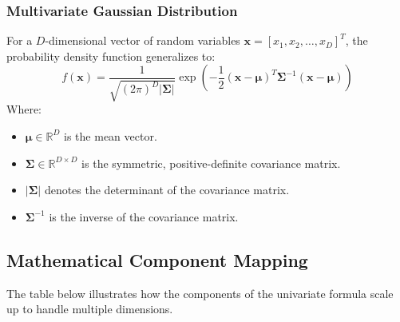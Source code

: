 \documentclass[a4paper,11pt]{article}
\begin{document}
\subsubsection{Multivariate Gaussian Distribution}
For a $D$-dimensional vector of random variables $\mathbf{x} = [x_1, x_2, \dots, x_D]^T$, the probability density function generalizes to:
\begin{equation}
f(\mathbf{x}) = \frac{1}{\sqrt{(2\pi)^D |\boldsymbol{\Sigma}|}} \exp\left( -\frac{1}{2} (\mathbf{x} - \boldsymbol{\mu})^T \boldsymbol{\Sigma}^{-1} (\mathbf{x} - \boldsymbol{\mu}) \right)
\end{equation}
Where:
\begin{itemize}
    \item $\boldsymbol{\mu} \in \mathbb{R}^D$ is the mean vector.
    \item $\boldsymbol{\Sigma} \in \mathbb{R}^{D \times D}$ is the symmetric, positive-definite covariance matrix.
    \item $|\boldsymbol{\Sigma}|$ denotes the determinant of the covariance matrix.
    \item $\boldsymbol{\Sigma}^{-1}$ is the inverse of the covariance matrix.
\end{itemize}

\subsection{Mathematical Component Mapping}

The table below illustrates how the components of the univariate formula scale up to handle multiple dimensions.
\end{document}
